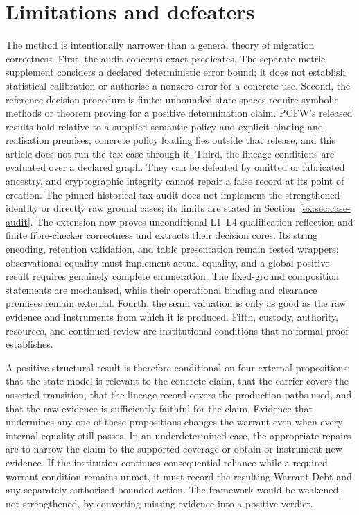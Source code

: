 \documentclass[11pt]{article}
\theoremstyle{definition}
\begin{document}
\section{Limitations and defeaters}\label{ex:sec:limitations}
The method is intentionally narrower than a general theory of migration correctness. First, the audit concerns exact predicates. The separate metric supplement considers a declared deterministic error bound; it does not establish statistical calibration or authorise a nonzero error for a concrete use. Second, the reference decision procedure is finite; unbounded state spaces require symbolic methods or theorem proving for a positive determination claim. PCFW's released results hold relative to a supplied semantic policy and explicit binding and realisation premises; concrete policy loading lies outside that release, and this article does not run the tax case through it. Third, the lineage conditions are evaluated over a declared graph. They can be defeated by omitted or fabricated ancestry, and cryptographic integrity cannot repair a false record at its point of creation. The pinned historical tax audit does not implement the strengthened identity or directly raw ground cases; its limits are stated in Section~\ref{ex:sec:case-audit}. The extension now proves unconditional L1--L4 qualification reflection and finite fibre-checker correctness and extracts their decision cores. Its string encoding, retention validation, and table presentation remain tested wrappers; observational equality must implement actual equality, and a global positive result requires genuinely complete enumeration. The fixed-ground composition statements are mechanised, while their operational binding and clearance premises remain external. Fourth, the seam valuation is only as good as the raw evidence and instruments from which it is produced. Fifth, custody, authority, resources, and continued review are institutional conditions that no formal proof establishes.

A positive structural result is therefore conditional on four external propositions: that the state model is relevant to the concrete claim, that the carrier covers the asserted transition, that the lineage record covers the production paths used, and that the raw evidence is sufficiently faithful for the claim. Evidence that undermines any one of these propositions changes the warrant even when every internal equality still passes. In an underdetermined case, the appropriate repairs are to narrow the claim to the supported coverage or obtain or instrument new evidence. If the institution continues consequential reliance while a required warrant condition remains unmet, it must record the resulting Warrant Debt and any separately authorised bounded action. The framework would be weakened, not strengthened, by converting missing evidence into a positive verdict.
\end{document}
